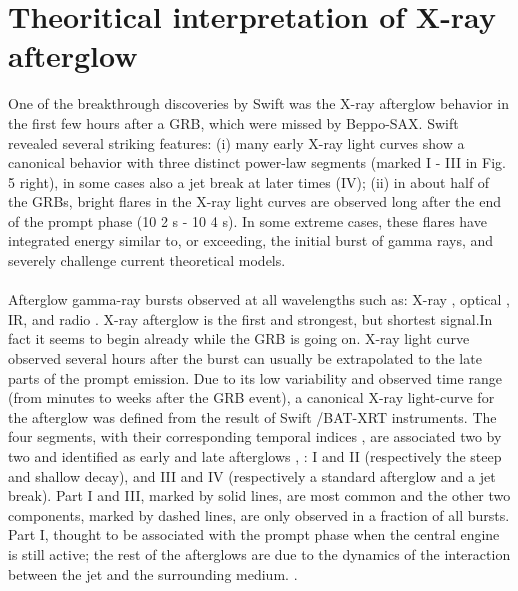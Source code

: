 \section{Theoritical interpretation of X-ray afterglow}
One of the breakthrough discoveries by Swift was the X-ray afterglow behavior in the first few hours after a GRB, which were missed by Beppo-SAX. Swift revealed several striking features: (i) many early X-ray light curves show a canonical behavior with three distinct power-law segments (marked I - III in Fig. 5 right), in some cases also a jet break at later times (IV); (ii) in about half of the GRBs, bright flares in the X-ray light curves are observed long after the end of the prompt
phase (10 2 s - 10 4 s). In some extreme cases, these flares have integrated energy similar to, or exceeding, the initial burst of gamma rays, and severely challenge current theoretical models.\\\\
Afterglow gamma-ray bursts  observed at all wavelengths such as: X-ray \citep{26}, optical \citep{27}, IR, and radio \citep{28}. X-ray afterglow is the first and strongest, but shortest signal.In fact it seems to begin already while the GRB is going on. X-ray light curve observed several hours after the burst can usually be extrapolated to the late parts of the prompt emission. Due to  its low variability and observed time range (from minutes to weeks after the GRB event), a canonical X-ray light-curve for the afterglow was defined from the result of Swift /BAT-XRT instruments. The four segments, with their corresponding temporal indices , are associated two by two and identified as early and late afterglows \citep{29},\citep{30}\citep{31} : I and II (respectively the steep and shallow decay), and III and IV (respectively a standard afterglow and a jet break). Part I and III, marked by solid lines, are most common and the other two components, marked by dashed lines, are only observed in a fraction of all bursts. Part I, thought to be associated with the prompt phase  when the central engine is still active; the rest of the afterglows are due to the dynamics of the interaction between the jet and the surrounding medium.\citep{6}\cite {15}\citep{18} \citep{32}.\\\\
